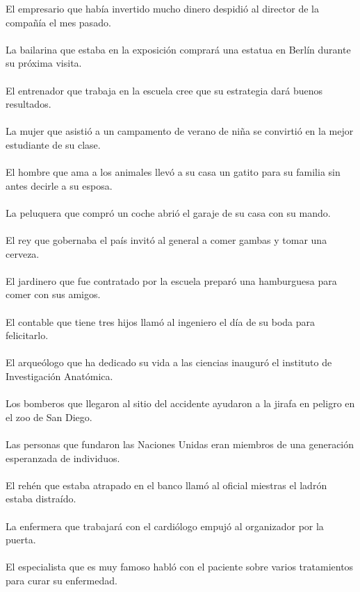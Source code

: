 El  empresario que había invertido mucho dinero despidió al director de la compañía el mes pasado.	\\	\\
La bailarina que estaba en la exposición comprará una estatua en Berlín durante su próxima visita.	\\	\\
El entrenador que trabaja en la escuela cree que su estrategia dará buenos resultados.	\\	\\
La mujer que asistió a un campamento de verano de niña se convirtió en la mejor estudiante de su clase.	\\	\\
El hombre que ama a los animales llevó a su casa un gatito para su familia sin antes decirle a su esposa.	\\	\\
La peluquera que compró un coche abrió el garaje de su casa con su mando.	\\	\\
El rey que gobernaba el país invitó al general a comer gambas y tomar una cerveza.	\\	\\
El jardinero que fue contratado por la escuela preparó una hamburguesa para comer con sus amigos.	\\	\\
El contable que tiene tres hijos llamó al ingeniero el día de su boda para felicitarlo.	\\	\\
El arqueólogo que ha dedicado su vida a las ciencias inauguró el instituto de Investigación Anatómica.	\\	\\
Los bomberos que llegaron al sitio del accidente ayudaron a la jirafa en peligro en el zoo de San Diego.	\\	\\
Las personas que fundaron las Naciones Unidas eran miembros de una generación esperanzada de individuos.	\\	\\
El rehén que estaba atrapado en el banco llamó al oficial miestras el ladrón estaba distraído.	\\	\\
La enfermera que trabajará con el cardiólogo empujó al organizador por la puerta.	\\	\\
El especialista que es muy famoso habló con el paciente sobre varios tratamientos para curar su enfermedad.	\\	\\
